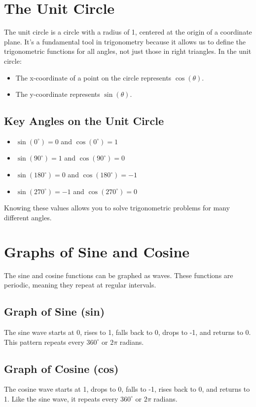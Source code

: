 \section{The Unit Circle}
The unit circle is a circle with a radius of 1, centered at the origin of a coordinate plane. It’s a fundamental tool in trigonometry because it allows us to define the trigonometric functions for all angles, not just those in right triangles.
In the unit circle:
\begin{itemize}
    \item The x-coordinate of a point on the circle represents $\cos(\theta)$.
    \item The y-coordinate represents $\sin(\theta)$.
\end{itemize}

\subsection{Key Angles on the Unit Circle}
\begin{itemize}
    \item $\sin(0^\circ) = 0$ and $\cos(0^\circ) = 1$
    \item $\sin(90^\circ) = 1$ and $\cos(90^\circ) = 0$
    \item $\sin(180^\circ) = 0$ and $\cos(180^\circ) = -1$
    \item $\sin(270^\circ) = -1$ and $\cos(270^\circ) = 0$
\end{itemize}
Knowing these values allows you to solve trigonometric problems for many different angles.

\section{Graphs of Sine and Cosine}
The sine and cosine functions can be graphed as waves. These functions are periodic, meaning they repeat at regular intervals.

\subsection{Graph of Sine (sin)}
The sine wave starts at 0, rises to 1, falls back to 0, drops to -1, and returns to 0. This pattern repeats every $360^\circ$ or $2\pi$ radians.

\subsection{Graph of Cosine (cos)}
The cosine wave starts at 1, drops to 0, falls to -1, rises back to 0, and returns to 1. Like the sine wave, it repeats every $360^\circ$ or $2\pi$ radians.

